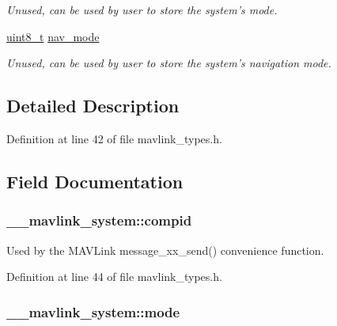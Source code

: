 \begin{DoxyCompactItemize}
\begin{DoxyCompactList}\small\item\em Unused, can be used by user to store the system's mode. \end{DoxyCompactList}\item 
\hyperlink{stdint_8h_aba7bc1797add20fe3efdf37ced1182c5}{uint8\-\_\-t} \hyperlink{struct____mavlink__system_ae653c03239304982024c03ac165c5011}{nav\-\_\-mode}
\begin{DoxyCompactList}\small\item\em Unused, can be used by user to store the system's navigation mode. \end{DoxyCompactList}\end{DoxyCompactItemize}


\subsection{Detailed Description}


Definition at line 42 of file mavlink\-\_\-types.\-h.



\subsection{Field Documentation}
\hypertarget{struct____mavlink__system_a1aec3b4f214beea3276a214c7498cb0f}{
\subsubsection[{compid}]{ \-\_\-\-\_\-mavlink\-\_\-system\-::compid}}\label{struct____mavlink__system_a1aec3b4f214beea3276a214c7498cb0f}


Used by the M\-A\-V\-Link message\-\_\-xx\-\_\-send() convenience function. 



Definition at line 44 of file mavlink\-\_\-types.\-h.

\hypertarget{struct____mavlink__system_a4bd3edea462570856b5575eecafd2b6d}{
\subsubsection[{mode}]{ \-\_\-\-\_\-mavlink\-\_\-system\-::mode}}\label{struct____mavlink__system_a4bd3edea462570856b5575eecafd2b6d}



